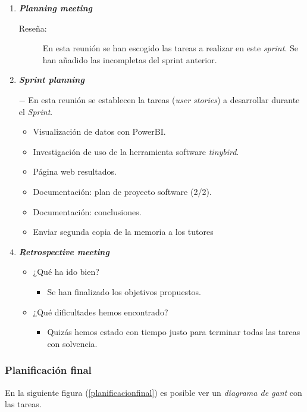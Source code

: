 \begin{enumerate}
	\item \textbf{\textit{Planning meeting}}
	\begin{description}
		\item[Reseña:] En esta reunión se han escogido las tareas a realizar en este \textit{sprint}. Se han añadido las incompletas del sprint anterior.
	\end{description}
	\item \textbf{\textit{Sprint planning}}
	\item[$-$] En esta reunión se establecen la tareas (\textit{user stories}) a desarrollar durante el \textit{Sprint}. 
	\begin{itemize}
		\item Visualización de datos con PowerBI.
		\item Investigación de uso de la herramienta software \textit{tinybird}.
		\item Página web resultados.
		\item Documentación: plan de proyecto software (2/2).
		\item Documentación: conclusiones.
		\item Enviar segunda copia de la memoria a los tutores
	\end{itemize}
	\item \textbf{\textit{Retrospective meeting}}
	\begin{itemize}
		\item ¿Qué ha ido bien?
		\begin{itemize}
		\item Se han finalizado los objetivos propuestos.
		\end{itemize}
		\item ¿Qué dificultades hemos encontrado?
		\begin{itemize}
		\item Quizás hemos estado con tiempo justo para terminar todas las tareas con solvencia.
		\end{itemize}
	\end{itemize}	
\end{enumerate}

\subsubsection{Planificación final}

En la siguiente figura (\ref{planificacionfinal}) es posible ver un \textit{diagrama de gant} con las tareas.


